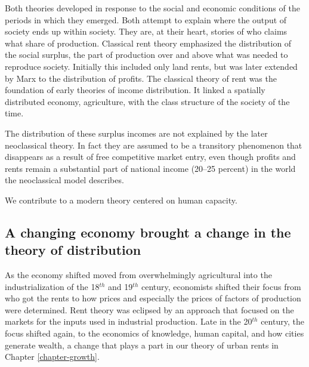Both theories developed in response to the social and economic conditions of the periods in which they emerged. Both attempt to explain where the output of society ends up within society. They are, at their heart, stories of who %
claims what share of production. Classical rent theory emphasized the distribution of the social \gls{surplus}, the part of production over and above what was needed to reproduce society. Initially this included only land rents, but was later extended by Marx to the distribution of profits.
The classical theory of rent was the foundation of early %
theories of income distribution. It linked a spatially distributed economy, agriculture, with the class structure of the society of the time. 

The distribution of these surplus incomes are not explained by the later neoclassical theory. In fact they are assumed to be a transitory phenomenon that disappears as a result of free competitive market entry, even though profits and rents remain a substantial part of national income (20–25 percent) \cite{GET_Britannica} %
in the world the neoclassical model describes. 



We contribute to a modern theory centered on human capacity.




\subsection{A changing economy brought a change in the theory of distribution}
As the economy shifted  moved from overwhelmingly  agricultural into the industrialization of the 18$^{th}$  and 19$^{th}$ century, economists shifted their focus from who got the rents to how prices and especially the prices of factors of production were determined. Rent theory was eclipsed by an approach that focused on the markets for the inputs used in industrial production.  Late in the 20$^{th}$ century, the focus shifted again, to the economics of  knowledge, human capital, and how cities generate wealth, a change that plays a part in  our theory of urban rents in Chapter \ref{chapter-growth}. 
 
